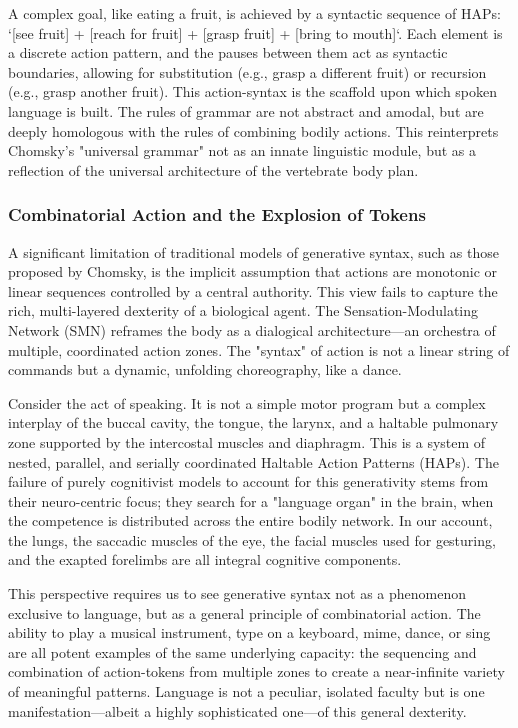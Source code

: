 A complex goal, like eating a fruit, is achieved by a syntactic sequence of HAPs: `[see fruit] + [reach for fruit] + [grasp fruit] + [bring to mouth]`. Each element is a discrete action pattern, and the pauses between them act as syntactic boundaries, allowing for substitution (e.g., grasp a different fruit) or recursion (e.g., grasp another fruit). This action-syntax is the scaffold upon which spoken language is built. The rules of grammar are not abstract and amodal, but are deeply homologous with the rules of combining bodily actions. This reinterprets Chomsky's "universal grammar" not as an innate linguistic module, but as a reflection of the universal architecture of the vertebrate body plan.

\subsubsection{Combinatorial Action and the Explosion of Tokens}
\label{ssubsec:combinatorial}
A significant limitation of traditional models of generative syntax, such as those proposed by Chomsky, is the implicit assumption that actions are monotonic or linear sequences controlled by a central authority. This view fails to capture the rich, multi-layered dexterity of a biological agent. The Sensation-Modulating Network (SMN) reframes the body as a dialogical architecture—an orchestra of multiple, coordinated action zones. The "syntax" of action is not a linear string of commands but a dynamic, unfolding choreography, like a dance.

Consider the act of speaking. It is not a simple motor program but a complex interplay of the buccal cavity, the tongue, the larynx, and a haltable pulmonary zone supported by the intercostal muscles and diaphragm. This is a system of nested, parallel, and serially coordinated Haltable Action Patterns (HAPs). The failure of purely cognitivist models to account for this generativity stems from their neuro-centric focus; they search for a "language organ" in the brain, when the competence is distributed across the entire bodily network. In our account, the lungs, the saccadic muscles of the eye, the facial muscles used for gesturing, and the exapted forelimbs are all integral cognitive components.

This perspective requires us to see generative syntax not as a phenomenon exclusive to language, but as a general principle of combinatorial action. The ability to play a musical instrument, type on a keyboard, mime, dance, or sing are all potent examples of the same underlying capacity: the sequencing and combination of action-tokens from multiple zones to create a near-infinite variety of meaningful patterns. Language is not a peculiar, isolated faculty but is one manifestation—albeit a highly sophisticated one—of this general dexterity.

